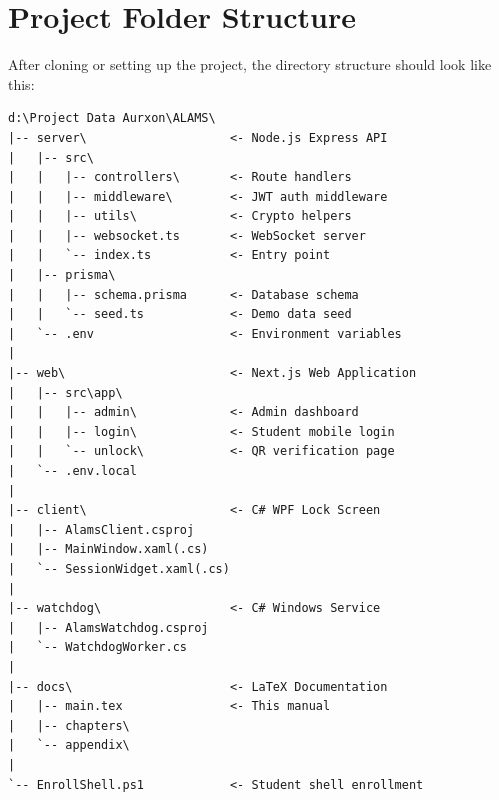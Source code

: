 \section{Project Folder Structure}

After cloning or setting up the project, the directory structure should look like this:

\begin{tcolorbox}[codebox, title={ALAMS Project Directory Tree}]
\begin{lstlisting}
d:\Project Data Aurxon\ALAMS\
|-- server\                    <- Node.js Express API
|   |-- src\
|   |   |-- controllers\       <- Route handlers
|   |   |-- middleware\        <- JWT auth middleware
|   |   |-- utils\             <- Crypto helpers
|   |   |-- websocket.ts       <- WebSocket server
|   |   `-- index.ts           <- Entry point
|   |-- prisma\
|   |   |-- schema.prisma      <- Database schema
|   |   `-- seed.ts            <- Demo data seed
|   `-- .env                   <- Environment variables
|
|-- web\                       <- Next.js Web Application
|   |-- src\app\
|   |   |-- admin\             <- Admin dashboard
|   |   |-- login\             <- Student mobile login
|   |   `-- unlock\            <- QR verification page
|   `-- .env.local
|
|-- client\                    <- C# WPF Lock Screen
|   |-- AlamsClient.csproj
|   |-- MainWindow.xaml(.cs)
|   `-- SessionWidget.xaml(.cs)
|
|-- watchdog\                  <- C# Windows Service
|   |-- AlamsWatchdog.csproj
|   `-- WatchdogWorker.cs
|
|-- docs\                      <- LaTeX Documentation
|   |-- main.tex               <- This manual
|   |-- chapters\
|   `-- appendix\
|
`-- EnrollShell.ps1            <- Student shell enrollment
\end{lstlisting}
\end{tcolorbox}
